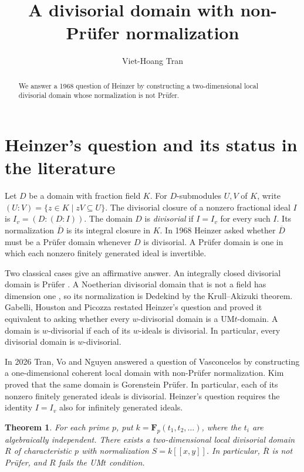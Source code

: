 \documentclass[11pt,reqno]{amsart}
\title[Divisorial domains and normalization]{A divisorial domain with non-Pr\"ufer normalization}
\author{Viet-Hoang Tran}
\date{}
\newtheorem{theorem}{Theorem}[section]
\newcommand{\F}{\mathbf F}
\begin{document}
\raggedbottom
\begin{abstract}
We answer a 1968 question of Heinzer by constructing a two-dimensional local
divisorial domain whose normalization is not Pr\"ufer.
\end{abstract}
\maketitle

\section{Heinzer's question and its status in the literature}

Let \(D\) be a domain with fraction field \(K\). For \(D\)-submodules \(U,V\)
of \(K\), write \((U:V)=\{z\in K\mid zV\subseteq U\}\). The divisorial closure
of a nonzero fractional ideal \(I\) is \(I_v=(D:(D:I))\). The domain \(D\)
is \emph{divisorial} if \(I=I_v\) for every such \(I\). Its normalization
\(\overline D\) is its integral closure in \(K\). In 1968 Heinzer \cite{Heinzer}
asked whether \(\overline D\) must be a Pr\"ufer domain whenever \(D\)
is divisorial. A Pr\"ufer domain is one in which each nonzero finitely generated
ideal is invertible.

Two classical cases give an affirmative answer. An integrally closed
divisorial domain is Pr\"ufer \cite[Theorem~5.1]{Heinzer}. A Noetherian
divisorial domain that is not a field has dimension one
\cite[Corollary~4.3]{Heinzer}, so its normalization is Dedekind by the
Krull--Akizuki theorem. Gabelli, Houston and Picozza
\cite[Questions~3.7 and~3.8]{GHP} restated Heinzer's question and proved it
equivalent to asking whether every \(w\)-divisorial domain is a UM\(t\)-domain.
A domain is \(w\)-divisorial if each of its \(w\)-ideals is divisorial.
In particular, every divisorial domain is \(w\)-divisorial.

In 2026 Tran, Vo and Nguyen \cite{TVN} answered a question of Vasconcelos
by constructing a one-dimensional coherent local domain with non-Pr\"ufer
normalization. Kim
\cite[Theorem~A]{Kim} proved that the same domain is Gorenstein Pr\"ufer.
In particular, each of its nonzero finitely generated ideals is divisorial.
Heinzer's question requires the identity \(I=I_v\) also for infinitely
generated ideals.

\begin{theorem}\label{thm:main}
For each prime \(p\), put \(k=\F_p(t_1,t_2,\ldots)\), where the \(t_i\)
are algebraically independent. There exists a two-dimensional local divisorial
domain \(R\) of characteristic \(p\) with normalization \(S=k[[x,y]]\).
In particular, \(\overline R\) is not Pr\"ufer, and \(R\) fails the
UM\(t\) condition.
\end{theorem}
\end{document}
